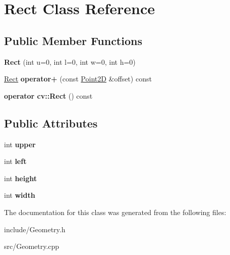 \hypertarget{classRect}{}\section{Rect Class Reference}
\label{classRect}
\subsection*{Public Member Functions}
\begin{DoxyCompactItemize}
\item 
\hypertarget{classRect_ad197c38803bb8538dd04e5a92b5e12e6}{}{\bfseries Rect} (int u=0, int l=0, int w=0, int h=0)\label{classRect_ad197c38803bb8538dd04e5a92b5e12e6}

\item 
\hypertarget{classRect_a7fbb8992edb8c3839c83045213d21631}{}\hyperlink{classRect}{Rect} {\bfseries operator+} (const \hyperlink{classPoint2D}{Point2\+D} \&offset) const \label{classRect_a7fbb8992edb8c3839c83045213d21631}

\item 
\hypertarget{classRect_afb25e86036b7faa93e86aee8ba24cd35}{}{\bfseries operator cv\+::\+Rect} () const \label{classRect_afb25e86036b7faa93e86aee8ba24cd35}

\end{DoxyCompactItemize}
\subsection*{Public Attributes}
\begin{DoxyCompactItemize}
\item 
\hypertarget{classRect_aaba0474a7052cee8cadd159c306e27bd}{}int {\bfseries upper}\label{classRect_aaba0474a7052cee8cadd159c306e27bd}

\item 
\hypertarget{classRect_ab0841a51d249d8560ddca36054fd1e57}{}int {\bfseries left}\label{classRect_ab0841a51d249d8560ddca36054fd1e57}

\item 
\hypertarget{classRect_ad79d7bf12771a81627a672452437011d}{}int {\bfseries height}\label{classRect_ad79d7bf12771a81627a672452437011d}

\item 
\hypertarget{classRect_a367714e71d566668addb140c7981b5bc}{}int {\bfseries width}\label{classRect_a367714e71d566668addb140c7981b5bc}

\end{DoxyCompactItemize}


The documentation for this class was generated from the following files\+:\begin{DoxyCompactItemize}
\item 
include/Geometry.\+h\item 
src/Geometry.\+cpp\end{DoxyCompactItemize}
